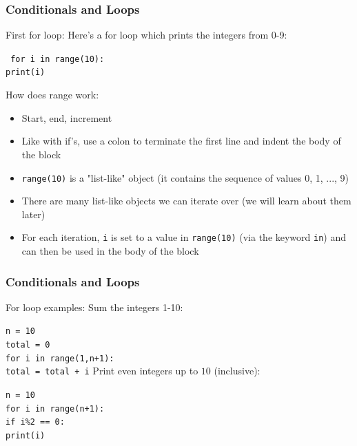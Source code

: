 \documentclass{beamer}
\newcommand{\code}[1]{\texttt{#1}}
\newcommand{\tab}{\hspace*{22pt}}
\begin{document}
\begin{frame}%
	\frametitle{Conditionals and Loops}
	
	\begin{block}{First for loop:}
			Here's a for loop which prints the integers from 0-9: \\
			
			\vspace{10pt}
			
			\code{
				for i in range(10): \\
				\tab print(i)}
			
			\vspace{20pt}
			
			How does range work:
			\begin{itemize}
				\item Start, end, increment
			\end{itemize}
		\endminipage\hfill
			\begin{itemize}
				\item Like with if's, use a colon to terminate the first line and indent the body of the block
				\item \code{range(10)} is a "list-like" object (it contains the sequence of values 0, 1, ..., 9)
				\item There are many list-like objects we can iterate over (we will learn about them later)
				\item For each iteration, \code{i} is set to a value in \code{range(10)} (via the keyword \code{in}) and can then be used in the body of the block
			\end{itemize}
		\endminipage\hfill
	\end{block}
	
\end{frame}

\begin{frame}%
	\frametitle{Conditionals and Loops}
	
	\begin{block}{For loop examples:}
			Sum the integers 1-10: \\
			
			\vspace{10pt}
			
			\code{n = 10 \\
				total = 0 \\
				for i in range(1,n+1): \\
				\tab total = total + i}
		\endminipage\hfill
			Print even integers up to $10$ (inclusive): \\
			
			\vspace{10pt}
			
			\code{n = 10 \\
				for i in range(n+1): \\
				\tab if i\%2 == 0: \\
				\tab \tab print(i) }
		\endminipage\hfill
	\end{block}
	
\end{frame}
\end{document}
